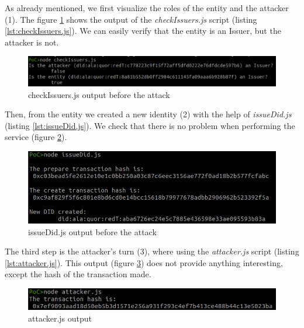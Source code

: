 \documentclass[a4paper, 12pt]{article} %
\begin{document}
        As already mentioned, we first visualize the roles of the entity and the attacker (1). The figure \ref{fig:poc-1} shows the output of the \textit{checkIssuers.js} script (listing \ref{lst:checkIssuers.js}). We can easily verify that the entity is an Issuer, but the attacker is not.\\
        \begin{figure}[h]
            \centering
            \includegraphics[width=1.0\textwidth]{poc/1.png}
            \caption{checkIssuers.js output before the attack}
            \label{fig:poc-1}
        \end{figure}
        
        Then, from the entity we created a new identity (2) with the help of \textit{issueDid.js} (listing \ref{lst:issueDid.js}). We check that there is no problem when performing the service (figure \ref{fig:poc-2}).\\
        \begin{figure}[h]
            \centering
            \includegraphics[width=1.0\textwidth]{poc/2.png}
            \caption{issueDid.js output before the attack}
            \label{fig:poc-2}
        \end{figure}
        
        The third step is the attacker's turn (3), where using the \textit{attacker.js} script (listing \ref{lst:attacker.js}). This output (figure \ref{fig:poc-3}) does not provide anything interesting, except the hash of the transaction made.\\
        \begin{figure}[h]
            \centering
            \includegraphics[width=1.0\textwidth]{poc/3.png}
            \caption{attacker.js output}
            \label{fig:poc-3}
        \end{figure}
        
\end{document}
